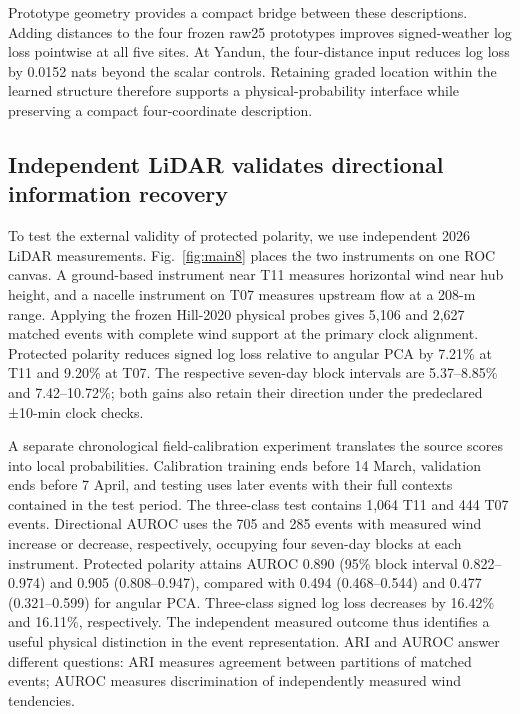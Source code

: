 \documentclass[preprint,12pt]{elsarticle}
\begin{document}
Prototype geometry provides a compact bridge between these descriptions. Adding distances to the four frozen raw25 prototypes improves signed-weather log loss pointwise at all five sites. At Yandun, the four-distance input reduces log loss by 0.0152 nats beyond the scalar controls. Retaining graded location within the learned structure therefore supports a physical-probability interface while preserving a compact four-coordinate description.

\subsection{Independent LiDAR validates directional information recovery}\label{independent-lidar-validates-directional-information-recovery}

To test the external validity of protected polarity, we use independent 2026 LiDAR measurements. Fig.~\ref{fig:main8} places the two instruments on one ROC canvas. A ground-based instrument near T11 measures horizontal wind near hub height, and a nacelle instrument on T07 measures upstream flow at a 208-m range. Applying the frozen Hill-2020 physical probes gives 5,106 and 2,627 matched events with complete wind support at the primary clock alignment. Protected polarity reduces signed log loss relative to angular PCA by 7.21\% at T11 and 9.20\% at T07. The respective seven-day block intervals are 5.37--8.85\% and 7.42--10.72\%; both gains also retain their direction under the predeclared ±10-min clock checks.

A separate chronological field-calibration experiment translates the source scores into local probabilities. Calibration training ends before 14 March, validation ends before 7 April, and testing uses later events with their full contexts contained in the test period. The three-class test contains 1,064 T11 and 444 T07 events. Directional AUROC uses the 705 and 285 events with measured wind increase or decrease, respectively, occupying four seven-day blocks at each instrument. Protected polarity attains AUROC 0.890 (95\% block interval 0.822--0.974) and 0.905 (0.808--0.947), compared with 0.494 (0.468--0.544) and 0.477 (0.321--0.599) for angular PCA. Three-class signed log loss decreases by 16.42\% and 16.11\%, respectively. The independent measured outcome thus identifies a useful physical distinction in the event representation. ARI and AUROC answer different questions: ARI measures agreement between partitions of matched events; AUROC measures discrimination of independently measured wind tendencies.
\end{document}

